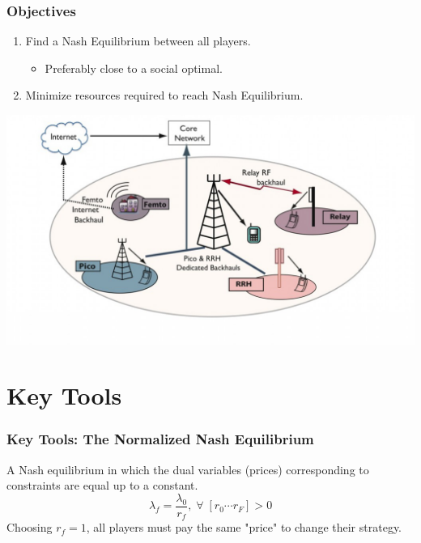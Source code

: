 \documentclass[10pt,tgadventor, onlymath]{beamer}
\begin{document}
\begin{frame}
\frametitle{Objectives}
\begin{enumerate}
\setlength\itemsep{2em}

\item Find a Nash Equilibrium between all players.
\begin{itemize}
\item Preferably close to a social optimal.
\end{itemize}
\item Minimize resources required to reach Nash Equilibrium.
\end{enumerate}
\begin{center}
%
%
		\includegraphics[scale=.2]{het_net}

\end{center}

\end{frame}

\section{Key Tools}

\begin{frame}
\frametitle{Key Tools: The Normalized Nash Equilibrium}
A Nash equilibrium in which the dual variables (prices) corresponding to constraints are equal up to a constant.
\begin{equation}
\lambda_f = \frac{\lambda_{0}}{ r_f}, \; \forall \; [r_0 \cdots r_F] > 0 
\end{equation}
Choosing $r_f =1$, all players must pay the same "price" to change their strategy. 
\end{frame}
\end{document}
